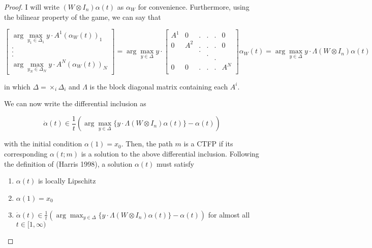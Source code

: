\documentclass{article}
\theoremstyle{definition}
\begin{document}
\begin{proof}
		I will write $(W \otimes I_n) \alpha(t)$ as $\alpha_W$ for convenience. Furthermore, using
		the bilinear property of the game, we can say that

		\begin{equation}
			\begin{bmatrix}
				\arg\max_{y_1 \in \Delta_1} y \cdot A^1 ( \alpha_W(t))_1 \\
				.\\
				.\\
				.\\
				\arg \max_{y_N \in \Delta_N} y \cdot A^N (\alpha_W(t))_N 
			\end{bmatrix} = 
			\arg \max_{y \in \Delta} y \cdot \begin{bmatrix}
				A^1 & 0 & . & . & . & 0 \\
				0 & A^2 & . & . & . & 0 \\
				& & . & & & \\
				& & & . & & \\
				& & & & . & \\
				0 & 0 & . & . & . & A^N \\
			\end{bmatrix} \alpha_W(t) = \arg\max_{y \in \Delta} y \cdot \Lambda (W \otimes I_n)
			\alpha(t)
		\end{equation}

		in which $\Delta = \times_i \Delta_i$ and $\Lambda$ is the block diagonal matrix containing
		each $A^i$. 

		We can now write the differential inclusion as

		\begin{equation}
			\dot{\alpha}(t) \in \frac{1}{t} (\arg \max_{y \in \Delta}  \{y \cdot \Lambda (W \otimes
			I_n)
			\alpha(t) \}- \alpha(t))
		\end{equation}

		with the initial condition $\alpha(1) = x_0$. Then, the path $m$ is a CTFP if its
		corresponding $\alpha(t; m)$ is a solution to the above differential inclusion. Following
		the definition of (Harris 1998), a solution $\alpha(t)$ must satisfy

		\begin{enumerate}
			\item $\alpha(t)$ is locally Lipschitz
			\item $\alpha(1) = x_0$
			\item $\dot{\alpha}(t) \in \frac{1}{t} (\arg \max_{y \in \Delta}  \{y \cdot \Lambda (W \otimes
			I_n)
			\alpha(t) \}- \alpha(t))$ for almost all $t \in [1, \infty)$ 
		\end{enumerate}


\end{proof}
\end{document}
